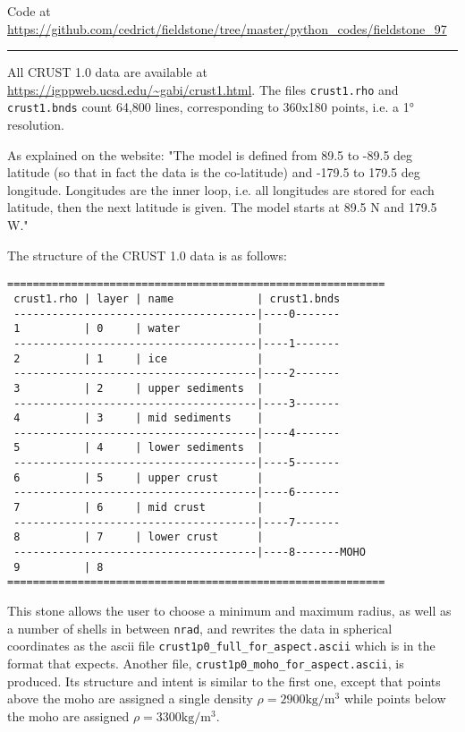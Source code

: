 

\begin{center}
Code at \url{https://github.com/cedrict/fieldstone/tree/master/python_codes/fieldstone_97}
\end{center}

\par\noindent\rule{\textwidth}{0.4pt}


All CRUST 1.0 data are available at \url{https://igppweb.ucsd.edu/~gabi/crust1.html}. 
The files {\tt crust1.rho} and {\tt crust1.bnds} count 64,800 lines,
corresponding to 360x180 points, i.e. a 1\si{\degree} resolution. 

As explained on the website: 
"The model is defined from 89.5 to -89.5 deg latitude (so that 
in fact the data is the co-latitude) and -179.5 to 179.5 deg
longitude. Longitudes are the inner loop, i.e. all longitudes are stored
for each latitude, then the next latitude is given. The model starts at 
89.5 N and 179.5 W."

The structure of the CRUST 1.0 data is as follows:

\begin{verbatim}
===========================================================
 crust1.rho | layer | name             | crust1.bnds
 --------------------------------------|----0-------
 1          | 0     | water            |
 --------------------------------------|----1-------
 2          | 1     | ice              |
 --------------------------------------|----2-------
 3          | 2     | upper sediments  |
 --------------------------------------|----3-------
 4          | 3     | mid sediments    |
 --------------------------------------|----4-------
 5          | 4     | lower sediments  | 
 --------------------------------------|----5-------
 6          | 5     | upper crust      |
 --------------------------------------|----6-------
 7          | 6     | mid crust        |
 --------------------------------------|----7-------
 8          | 7     | lower crust      |
 --------------------------------------|----8-------MOHO
 9          | 8
===========================================================
\end{verbatim}

This stone allows the user to choose a minimum and maximum radius, as well as a 
number of shells in between {\tt nrad}, and rewrites the data in spherical coordinates 
as the ascii file {\tt crust1p0\_full\_for\_aspect.ascii} which is in the format that \aspect{} expects.
Another file, {\tt crust1p0\_moho\_for\_aspect.ascii}, is produced. Its structure and intent
is similar to the first one, except that points above the moho are assigned a single 
density $\rho=2900\si{\kilo\gram\per\cubic\metre}$ while points below the 
moho are assigned $\rho=3300\si{\kilo\gram\per\cubic\metre}$.

